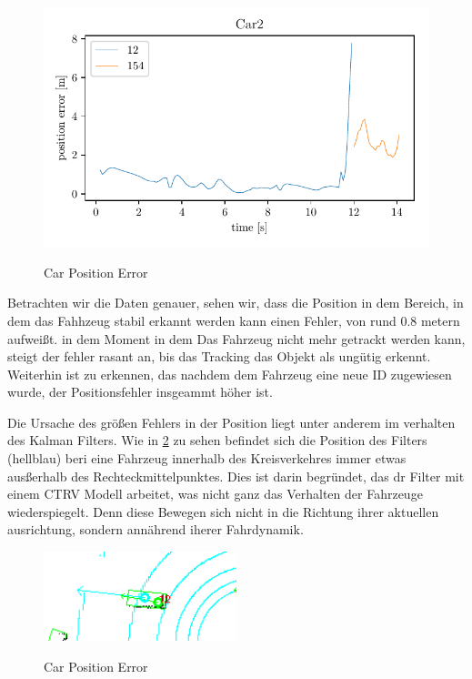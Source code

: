 \documentclass[11pt,oneside,openright]{mpreport}
\begin{document}
\begin{figure}[!htb]
  \caption{Car Position Error} 
  \centering
  \includegraphics[width=\textwidth]{bilder/Car2_pos_err.pdf}
 \label{car_pos_err}
\end{figure}
Betrachten wir die Daten genauer, sehen wir, dass die Position in dem Bereich, in dem das Fahhzeug stabil erkannt werden kann einen Fehler, von rund 0.8 metern aufweißt.
in dem Moment in dem Das Fahrzeug nicht mehr getrackt werden kann, steigt der fehler rasant an, bis das Tracking das Objekt als ungütig erkennt.
Weiterhin ist zu erkennen, das nachdem dem Fahrzeug eine neue ID zugewiesen wurde, der Positionsfehler insgeammt höher ist.

Die Ursache des größen Fehlers in der Position liegt unter anderem im verhalten des Kalman Filters. Wie in \cref{kalman_error} zu sehen
befindet sich die Position des Filters (hellblau) beri eine Fahrzeug innerhalb des Kreisverkehres immer etwas ausßerhalb des Rechteckmittelpunktes.
Dies ist darin begründet, das dr Filter mit einem \ac{CTRV} Modell arbeitet, was nicht ganz das Verhalten der Fahrzeuge wiederspiegelt.
Denn diese Bewegen sich nicht in die Richtung ihrer aktuellen ausrichtung, sondern annährend iherer  Fahrdynamik.

\begin{figure}[!htb]
  \caption{Car Position Error} 
  \centering
  \includegraphics[width=0.5\textwidth]{bilder/kalman.png}
 \label{kalman_error}
\end{figure}
\end{document}
